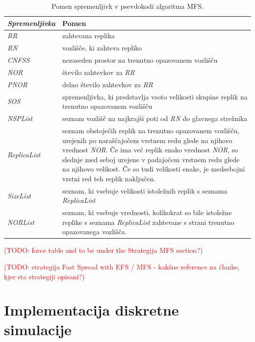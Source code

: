 \documentclass[a4paper, 12pt]{book}
\newcommand{\TODO}[1]{\textcolor{red}{(TODO: #1)}}
\begin{document}
\begin{table}
\small
  \begin{center}
    \begin{tabulary}{1.0\textwidth}{ >{\itshape}p{7em} J}
      \textnormal{Spremenljivka} & Pomen \\
      \hline
      RR & zahtevana replika \\
      RN &  vozlišče, ki zahteva repliko \\
      CNFSS & nezaseden prostor na trenutno opazovanem vozlišču \\
      NOR & število zahtevkov za \textit{RR} \\
      PNOR & delno število zahtevkov za \textit{RR} \\
      SOS & spremenljivka, ki predstavlja vsoto velikosti skupine replik na
          trenutno opazovanem vozlišču \\
      NSPList & seznam vozlišč na najkrajši poti od \textit{RN} do
          glavnega strežnika \\
      ReplicaList & seznam obstoječih replik na trenutno opazovanem vozlišču,
          urejenih po naraščajočem vrstnem redu glede na njihovo vrednost
          \textit{NOR}.
          Če ima več replik enako vrednost \textit{NOR}, so slednje med seboj
          urejene v padajočem vrstnem redu glede na njihovo velikost. Če so
          tudi velikosti enake, je medsebojni vrstni red teh replik
          naključen. \\
      SizeList & seznam, ki vsebuje velikosti istoležnih replik s seznama
          \textit{ReplicaList} \\
      NORList & seznam, ki vsebuje vrednosti, kolikokrat so bile istoležne
          replike s seznama \textit{ReplicaList} zahtevane s strani
          trenutno opazovanega vozlišča. \\
    \end{tabulary}
  \end{center}

  \caption{Pomen spremenljivk v psevdokodi algoritma MFS.}
  \label{tbl:MFS_vars}
\end{table}

\TODO{force table and to be under the Strategija MFS
section?}

\TODO{strategija Fast Spread with EFS / MFS - kakšne reference na članke, kjer
sta strategiji opisani?}


\section{Implementacija diskretne simulacije}
\end{document}
